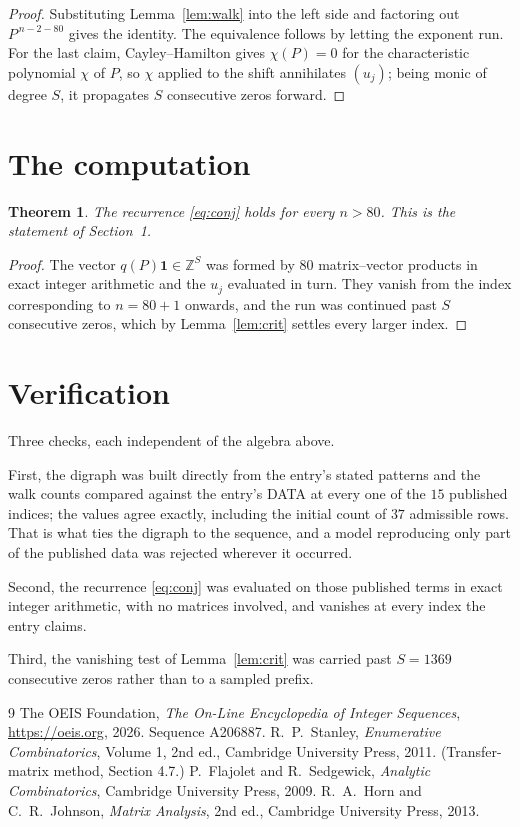 \documentclass[11pt,a4paper]{article}
\theoremstyle{plain}
\newtheorem{theorem}{Theorem}
\theoremstyle{definition}
\begin{document}
\begin{proof}
Substituting Lemma~\ref{lem:walk} into the left side and factoring out
$P^{\,n-2-80}$ gives the identity. The equivalence follows by letting the exponent
run. For the last claim, Cayley--Hamilton gives $\chi(P)=0$ for the characteristic
polynomial $\chi$ of $P$, so $\chi$ applied to the shift annihilates $(u_j)$; being monic of
degree $S$, it propagates $S$ consecutive zeros forward.
\end{proof}

\section{The computation}

\begin{theorem}
The recurrence \eqref{eq:conj} holds for every $n>80$. This is the statement of
Section~1.
\end{theorem}

\begin{proof}
The vector $q(P)\mathbf{1}\in\mathbb{Z}^{S}$ was formed by $80$ matrix--vector
products in exact integer arithmetic and the $u_j$ evaluated in turn. They vanish from the
index corresponding to $n=80+1$ onwards, and the run was continued past $S$ consecutive
zeros, which by Lemma~\ref{lem:crit} settles every larger index.
\end{proof}

\section{Verification}

Three checks, each independent of the algebra above.

First, the digraph was built directly from the entry's stated patterns and the walk counts
compared against the entry's DATA at every one of the $15$ published indices; the
values agree exactly, including the initial count of $37$ admissible rows. That is
what ties the digraph to the sequence, and a model reproducing only part of the published
data was rejected wherever it occurred.

Second, the recurrence \eqref{eq:conj} was evaluated on those published terms in exact
integer arithmetic, with no matrices involved, and vanishes at every index the entry claims.

Third, the vanishing test of Lemma~\ref{lem:crit} was carried past $S=1369$ consecutive
zeros rather than to a sampled prefix.

\begin{thebibliography}{9}
 The OEIS Foundation, \emph{The On-Line Encyclopedia of Integer
Sequences}, \url{https://oeis.org}, 2026. Sequence A206887.
 R.~P.~Stanley, \emph{Enumerative Combinatorics}, Volume 1, 2nd ed.,
Cambridge University Press, 2011. (Transfer-matrix method, Section 4.7.)
 P.~Flajolet and R.~Sedgewick, \emph{Analytic Combinatorics}, Cambridge
University Press, 2009.
 R.~A.~Horn and C.~R.~Johnson, \emph{Matrix Analysis}, 2nd ed., Cambridge
University Press, 2013.
\end{thebibliography}
\end{document}
